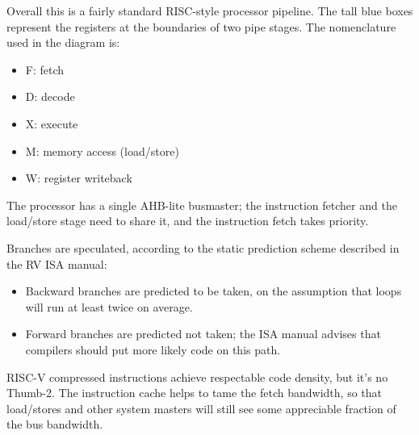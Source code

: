 \documentclass{article}
\begin{document}
Overall this is a fairly standard RISC-style processor pipeline. The tall blue boxes represent the registers at the boundaries of two pipe stages. The nomenclature used in the diagram is:

\begin{itemize}
\item F: fetch
\item D: decode
\item X: execute
\item M: memory access (load/store)
\item W: register writeback
\end{itemize}

The processor has a single AHB-lite busmaster; the instruction fetcher and the load/store stage need to share it, and the instruction fetch takes priority.

Branches are speculated, according to the static prediction scheme described in the RV ISA manual:

\begin{itemize}
\item Backward branches are predicted to be taken, on the assumption that loops will run at least twice on average.
\item Forward branches are predicted not taken; the ISA manual advises that compilers should put more likely code on this path.
\end{itemize}

RISC-V compressed instructions achieve respectable code density, but it's no Thumb-2. The instruction cache helps to tame the fetch bandwidth, so that load/stores and other system masters will still see some appreciable fraction of the bus bandwidth.
\end{document}
